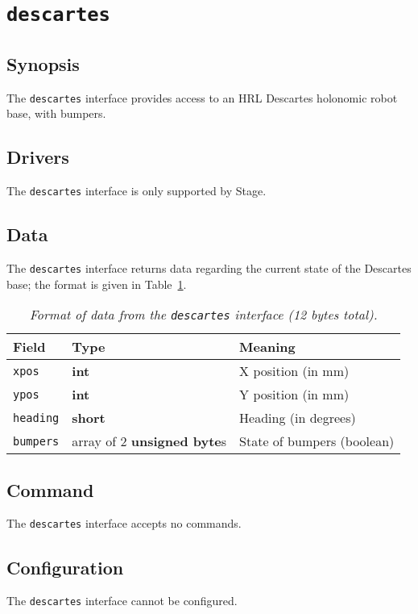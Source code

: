 \section{{\tt descartes}}
\subsection*{Synopsis}
The {\tt descartes} interface provides access to an HRL Descartes holonomic
robot base, with bumpers.

\subsection*{Drivers}
The {\tt descartes} interface is only supported by Stage.

\subsection*{Data}
The {\tt descartes} interface returns data regarding the current state of the
Descartes base; the format is given in Table~\ref{table:descartesdata}.

\begin{table}[ht]
\begin{center}
{\small \begin{tabular}{|l|l|l|}
\hline
Field & Type & Meaning\\
\hline
{\tt xpos} & {\bf int} & X position (in mm)\\
\hline
{\tt ypos} & {\bf int} & Y position (in mm)\\
\hline
{\tt heading} & {\bf short} & Heading (in degrees)\\
\hline
{\tt bumpers} & array of 2 {\bf unsigned byte}s & State of bumpers (boolean)\\
\hline
\end{tabular}}
\end{center}
\caption{{\em Format of data from the {\tt descartes} interface 
(12 bytes total).}}
\label{table:descartesdata}
\end{table}

\subsection*{Command}
The {\tt descartes} interface accepts no commands.

\subsection*{Configuration}
The {\tt descartes} interface cannot be configured.
